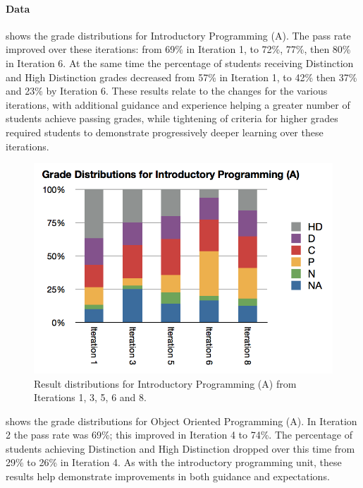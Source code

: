 
\paragraph{Data} %
\label{ssub:data_3_6}

 shows the grade distributions for Introductory Programming (A). The pass rate improved over these iterations: from 69\% in Iteration 1, to 72\%, 77\%, then 80\% in Iteration 6. At the same time the percentage of students receiving Distinction and High Distinction grades decreased from 57\% in Iteration 1, to 42\% then 37\% and 23\% by Iteration 6. These results relate to the changes for the various iterations, with additional guidance and experience helping a greater number of students achieve passing grades, while tightening of criteria for higher grades required students to demonstrate progressively deeper learning over these iterations.

\begin{figure}[htbp]
  \centering
  \includegraphics[width=0.8\columnwidth]{IntroProgA}
  \caption{Result distributions for Introductory Programming (A) from Iterations 1, 3, 5, 6 and 8.}
  \label{fig:intro_prog_1_9}
\end{figure}

 shows the grade distributions for Object Oriented Programming (A). In Iteration 2 the pass rate was 69\%; this improved in Iteration 4 to 74\%. The percentage of students achieving Distinction and High Distinction dropped over this time from 29\% to 26\% in Iteration 4. As with the introductory programming unit, these results help demonstrate improvements in both guidance and expectations. 

